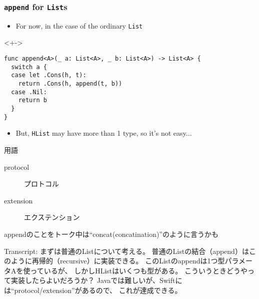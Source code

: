 \begin{frame}[fragile]
  \frametitle{\texttt{append} for \texttt{List}s}

  \begin{itemize}
    \item<+-> For now, in the case of the ordinary \lstinline|List|
  \end{itemize}

  \begin{uncoverenv}<+->
\begin{lstlisting}[style=swift]
func append<A>(_ a: List<A>, _ b: List<A>) -> List<A> {
  switch a {
  case let .Cons(h, t):
    return .Cons(h, append(t, b))
  case .Nil:
    return b
  }
}  
\end{lstlisting}     
  \end{uncoverenv}

  \begin{itemize}
    \item<+-> But, \lstinline|HList| may have more than 1 type,
    so it's not easy...
  \end{itemize}



  \begin{notes}
    \item 用語
    \begin{description}
      \item[protocol] プロトコル
      \item[extension] エクステンション
    \end{description}
    
    \item appendのことをトーク中は``concat(concatination)''のように言うかも

    \item Transcript:
    まずは普通のListについて考える。
    普通のListの結合（append）はこのように再帰的（recursive）に実装できる。
    このListのappendは1つ型パラメータAを使っているが、
    しかしHListはいくつも型がある。
    こういうときどうやって実装したらよいだろうか？
    Javaでは難しいが、Swiftには``protocol/extension''があるので、
    これが達成できる。
  \end{notes}
\end{frame}

